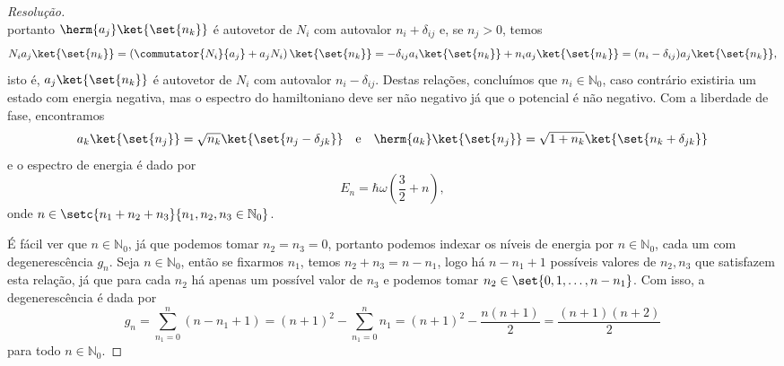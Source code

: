 \begin{proof}[Resolução]
\begin{equation*}
    \end{equation*}
    portanto \(\herm{a_j}\ket{\set{n_k}}\) é autovetor de \(N_i\) com autovalor \(n_i + \delta_{ij}\) e, se \(n_j > 0\), temos
    \begin{equation*}
        N_ia_j\ket{\set{n_k}} = \left(\commutator{N_i}{a_j}  + a_jN_i\right)\ket{\set{n_k}} = -\delta_{ij}a_i\ket{\set{n_k}} + n_i a_j\ket{\set{n_k}} = (n_i - \delta_{ij}) a_j \ket{\set{n_k}},
    \end{equation*}
    isto é, \(a_j\ket{\set{n_k}}\) é autovetor de \(N_i\) com autovalor \(n_i - \delta_{ij}\). Destas relações, concluímos que \(n_i \in \mathbb{N}_0\), caso contrário existiria um estado com energia negativa, mas o espectro do hamiltoniano deve ser não negativo já que o potencial é não negativo. Com a liberdade de fase, encontramos
    \begin{equation*}
        a_k\ket{\set{n_j}} = \sqrt{n_k}\ket{\set{n_j - \delta_{jk}}}\quad\text{e}\quad\herm{a_k}\ket{\set{n_j}} = \sqrt{1 + n_k}\ket{\set{n_k + \delta_{jk}}}
    \end{equation*}
    e o espectro de energia é dado por
    \begin{equation*}
        E_n = \hbar \omega \left(\frac32 + n\right),
    \end{equation*}
    onde \(n \in \setc{n_1 + n_2 + n_3}{n_1, n_2, n_3 \in \mathbb{N}_0}\).

    É fácil ver que \(n \in \mathbb{N}_0\), já que podemos tomar \(n_2 = n_3 = 0\), portanto podemos indexar os níveis de energia por \(n \in \mathbb{N}_0\), cada um com degenerescência \(g_n\). Seja \(n \in \mathbb{N}_0\), então se fixarmos \(n_1\), temos \(n_2 + n_3 = n - n_1\), logo há \(n - n_1 + 1\) possíveis valores de \(n_2, n_3\) que satisfazem esta relação, já que para cada \(n_2\) há apenas um possível valor de \(n_3\) e podemos tomar \(n_2 \in \set{0, 1,\dots, n - n_1}\). Com isso, a degenerescência é dada por
    \begin{equation*}
        g_n = \sum_{n_1 = 0}^{n} (n - n_1 + 1) = (n + 1)^2 - \sum_{n_1 = 0}^n n_1 = (n+1)^2 - \frac{n(n+1)}{2} = \frac{(n+1)(n + 2)}{2}
    \end{equation*}
    para todo \(n \in \mathbb{N}_0\).


\end{proof}

